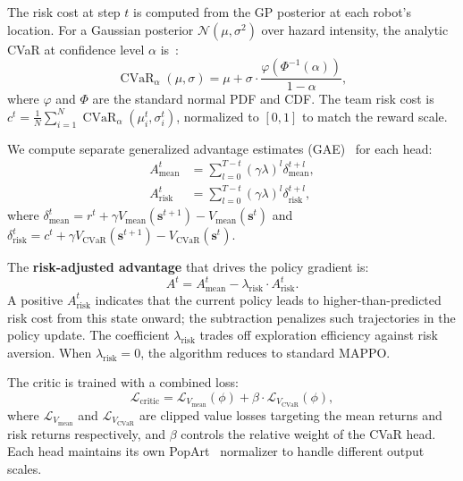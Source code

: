 \documentclass[letterpaper]{IEEEtran}
\newcommand{\vmean}{V_{\text{mean}}}
\newcommand{\vcvar}{V_{\text{CVaR}}}
\newcommand{\amean}{A_{\text{mean}}}
\newcommand{\arisk}{A_{\text{risk}}}
\newcommand{\lrisk}{\lambda_{\text{risk}}}
\newcommand{\sbf}{\mathbf{s}}
\DeclareMathOperator{\CVaR}{CVaR}
\begin{document}
The risk cost at step $t$ is computed from the GP posterior at each robot's location. For a Gaussian posterior $\mathcal{N}(\mu, \sigma^2)$ over hazard intensity, the analytic CVaR at confidence level $\alpha$ is~\cite{rockafellar2002conditional}:
\begin{equation}
\CVaR_\alpha(\mu, \sigma) = \mu + \sigma \cdot \frac{\varphi(\Phi^{-1}(\alpha))}{1 - \alpha},
\label{eq:cvar_gaussian}
\end{equation}
where $\varphi$ and $\Phi$ are the standard normal PDF and CDF. The team risk cost is $c^t = \frac{1}{N}\sum_{i=1}^{N} \CVaR_\alpha(\mu_i^t, \sigma_i^t)$, normalized to $[0, 1]$ to match the reward scale.

We compute separate generalized advantage estimates (GAE)~\cite{schulman2016gae} for each head:
\begin{align}
\amean^t &= \textstyle\sum_{l=0}^{T-t} (\gamma\lambda)^l \delta_{\text{mean}}^{t+l}, \label{eq:gae_mean} \\
\arisk^t &= \textstyle\sum_{l=0}^{T-t} (\gamma\lambda)^l \delta_{\text{risk}}^{t+l}, \label{eq:gae_risk}
\end{align}
where $\delta_{\text{mean}}^t = r^t + \gamma \vmean(\sbf^{t+1}) - \vmean(\sbf^t)$ and $\delta_{\text{risk}}^t = c^t + \gamma \vcvar(\sbf^{t+1}) - \vcvar(\sbf^t)$.

The \textbf{risk-adjusted advantage} that drives the policy gradient is:
\begin{equation}
A^t = \amean^t - \lrisk \cdot \arisk^t.
\label{eq:risk_advantage}
\end{equation}
A positive $\arisk^t$ indicates that the current policy leads to higher-than-predicted risk cost from this state onward; the subtraction penalizes such trajectories in the policy update. The coefficient $\lrisk$ trades off exploration efficiency against risk aversion. When $\lrisk = 0$, the algorithm reduces to standard MAPPO.

The critic is trained with a combined loss:
\begin{equation}
\mathcal{L}_{\text{critic}} = \mathcal{L}_{\vmean}(\phi) + \beta \cdot \mathcal{L}_{\vcvar}(\phi),
\label{eq:critic_loss}
\end{equation}
where $\mathcal{L}_{\vmean}$ and $\mathcal{L}_{\vcvar}$ are clipped value losses targeting the mean returns and risk returns respectively, and $\beta$ controls the relative weight of the CVaR head. Each head maintains its own PopArt~\cite{van2016learning} normalizer to handle different output scales.
\end{document}
